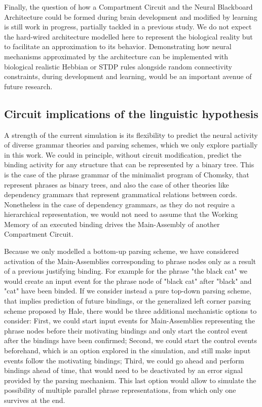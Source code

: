\documentclass[10pt]{article}
\begin{document}
Finally, the question of how a Compartment Circuit and the Neural Blackboard Architecture could be formed during brain development and modified by learning is still work in progress, partially tackled in a previous study\cite{van_der_Velde_2011}.
We do not expect the hard-wired architecture modelled here to represent the biological reality but to facilitate an approximation to its behavior.
Demonstrating how neural mechanisms approximated by the architecture can be implemented with biological realistic Hebbian or STDP rules alongside random connectivity constraints, during development and learning, would be an important avenue of future research.

\subsection{Circuit implications of the linguistic hypothesis}
\label{discussion-linguistics}

A strength of the current simulation is its flexibility to predict the neural activity of diverse grammar theories and parsing schemes, which we only explore partially in this work.
We could in principle, without circuit modification, predict the binding activity for any structure that can be represented by a binary tree.
This is the case of the phrase grammar of the minimalist program of Chomsky\cite{Chomsky_2014}, that represent phrases as binary trees, and also the case of other theories like dependency grammars\cite{nivre2005dependency} that represent grammatical relations between cords.
Nonetheless in the case of dependency grammars, as they do not require a hierarchical representation, we would not need to assume that the Working Memory of an executed binding drives the Main-Assembly of another Compartment Circuit.

Because we only modelled a bottom-up parsing scheme, we have considered activation of the Main-Assemblies corresponding to phrase nodes only as a result of a previous justifying binding.
For example for the phrase "the black cat" we would create an input event for the phrase node of "black cat" after "black" and "cat" have been binded.
If we consider instead a pure top-down parsing scheme, that implies prediction of future bindings, or the generalized left corner parsing scheme proposed by Hale\cite{hale2014automaton}, there would be three additional mechanistic options to consider:
First, we could start input events for Main-Assemblies representing the phrase nodes before their motivating bindings and only start the control event after the bindings have been confirmed;
Second, we could start the control events beforehand, which is an option explored in the simulation, and still make input events follow the motivating bindings;
Third, we could go ahead and perform bindings ahead of time, that would need to be deactivated by an error signal provided by the parsing mechanism. This last option would allow to simulate the possibility of multiple parallel phrase representations, from which only one survives at the end.
\end{document}

